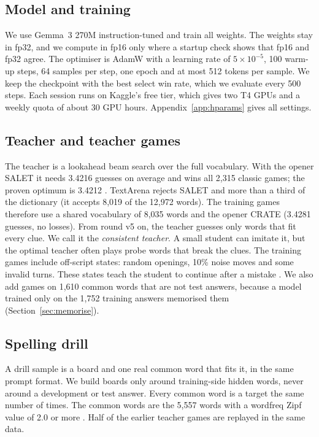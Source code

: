 \documentclass{article}
\begin{document}
\subsection{Model and training}
We use Gemma~3 270M instruction-tuned \citep{gemma3} and train all weights.
The weights stay in fp32, and we compute in fp16 only where a startup check shows that fp16 and fp32 agree.
The optimiser is AdamW with a learning rate of $5\times10^{-5}$, 100 warm-up steps, 64 samples per step, one epoch and at most 512 tokens per sample.
We keep the checkpoint with the best select win rate, which we evaluate every 500 steps.
Each session runs on Kaggle's free tier, which gives two T4 GPUs and a weekly quota of about 30 GPU hours.
Appendix~\ref{app:hparams} gives all settings.

\subsection{Teacher and teacher games}
\label{sec:teacher}
The teacher is a lookahead beam search over the full vocabulary.
With the opener SALET it needs 3.4216 guesses on average and wins all 2,315 classic games; the proven optimum is 3.4212 \citep{bertsimas2022wordle}.
TextArena rejects SALET and more than a third of the dictionary (it accepts 8,019 of the 12,972 words).
The training games therefore use a shared vocabulary of 8,035 words and the opener CRATE (3.4281 guesses, no losses).
From round v5 on, the teacher guesses only words that fit every clue.
We call it the \emph{consistent teacher}.
A small student can imitate it, but the optimal teacher often plays probe words that break the clues.
The training games include off-script states: random openings, 10\% noise moves and some invalid turns.
These states teach the student to continue after a mistake \citep{ross2011dagger}.
We also add games on 1,610 common words that are not test answers, because a model trained only on the 1,752 training answers memorised them (Section~\ref{sec:memorise}).

\subsection{Spelling drill}
\label{sec:drill}
A drill sample is a board and one real common word that fits it, in the same prompt format.
We build boards only around training-side hidden words, never around a development or test answer.
Every common word is a target the same number of times.
The common words are the 5,557 words with a wordfreq Zipf value of 2.0 or more \citep{speer2022wordfreq}.
Half of the earlier teacher games are replayed in the same data.
\end{document}
